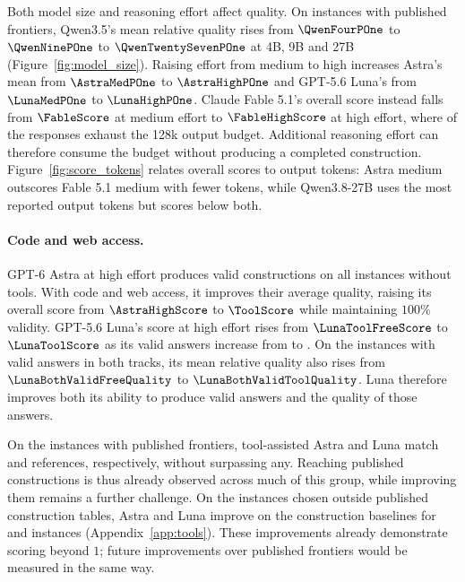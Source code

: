 \documentclass{article}
\begin{document}
\begin{samepage}
Both model size and reasoning effort affect quality. On instances with published frontiers, Qwen3.5's mean relative quality rises from $\QwenFourPOne$ to $\QwenNinePOne$ to $\QwenTwentySevenPOne$ at 4B, 9B and 27B (Figure~\ref{fig:model_size}). Raising effort from medium to high increases Astra's mean from $\AstraMedPOne$ to $\AstraHighPOne$ and GPT-5.6 Luna's from $\LunaMedPOne$ to $\LunaHighPOne$. Claude Fable 5.1's overall score instead falls from $\FableScore$ at medium effort to $\FableHighScore$ at high effort, where \FableHighBudgetStops{} of the \DistinctN{} responses exhaust the 128k output budget. Additional reasoning effort can therefore consume the budget without producing a completed construction. Figure~\ref{fig:score_tokens} relates overall scores to output tokens: Astra medium outscores Fable 5.1 medium with fewer tokens, while Qwen3.8-27B uses the most reported output tokens but scores below both.
\par
\end{samepage}

\paragraph{Code and web access.}
GPT-6 Astra at high effort produces valid constructions on all \DistinctN{} instances without tools. With code and web access, it improves their average quality, raising its overall score from $\AstraHighScore$ to $\ToolScore$ while maintaining $100\%$ validity. GPT-5.6 Luna's score at high effort rises from $\LunaToolFreeScore$ to $\LunaToolScore$ as its valid answers increase from \LunaToolFreeValid{} to \LunaToolValid{}. On the \LunaBothValidN{} instances with valid answers in both tracks, its mean relative quality also rises from $\LunaBothValidFreeQuality$ to $\LunaBothValidToolQuality$. Luna therefore improves both its ability to produce valid answers and the quality of those answers.

On the \PanelOneN{} instances with published frontiers, tool-assisted Astra and Luna match \ToolPublishedMatched{} and \LunaToolPublishedMatched{} references, respectively, without surpassing any. Reaching published constructions is thus already observed across much of this group, while improving them remains a further challenge. On the \PanelTwoN{} instances chosen outside published construction tables, Astra and Luna improve on the construction baselines for \ToolConstructionAbove{} and \LunaToolConstructionAbove{} instances (Appendix~\ref{app:tools}). These improvements already demonstrate scoring beyond $1$; future improvements over published frontiers would be measured in the same way.
\end{document}
